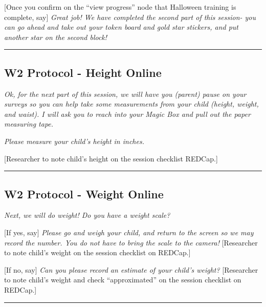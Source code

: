 \documentclass[
]{book}
\begin{document}
{[}Once you confirm on the ``view progress'' node that Halloween training is complete, say{]} \emph{Great job! We have completed the second part of this session- you can go ahead and take out your token board and gold star stickers, and put another star on the second block!}

\begin{center}\rule{0.5\linewidth}{0.5pt}\end{center}

\hypertarget{w2-protocol---height-online}{%
\subsection{W2 Protocol - Height Online}\label{w2-protocol---height-online}}

\emph{Ok, for the next part of this session, we will have you (parent) pause on your surveys so you can help take some measurements from your child (height, weight, and waist). I will ask you to reach into your Magic Box and pull out the paper measuring tape.}

\emph{Please measure your child's height in inches.}

{[}Researcher to note child's height on the session checklist REDCap.{]}

\begin{center}\rule{0.5\linewidth}{0.5pt}\end{center}

\hypertarget{w2-protocol---weight-online}{%
\subsection{W2 Protocol - Weight Online}\label{w2-protocol---weight-online}}

\emph{Next, we will do weight! Do you have a weight scale?}

{[}If yes, say{]} \emph{Please go and weigh your child, and return to the screen so we may record the number. You do not have to bring the scale to the camera!} {[}Researcher to note child's weight on the session checklist on REDCap.{]}

{[}If no, say{]} \emph{Can you please record an estimate of your child's weight?} {[}Researcher to note child's weight and check ``approximated'' on the session checklist on REDCap.{]}

\begin{center}\rule{0.5\linewidth}{0.5pt}\end{center}
\end{document}
